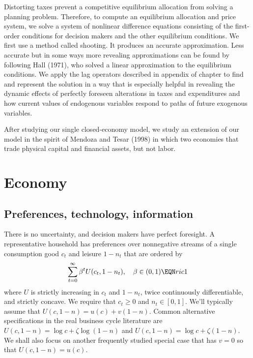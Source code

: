 Distorting taxes prevent a competitive equilibrium allocation
from solving a planning problem. Therefore, to compute an equilibrium allocation and price
system, we
solve a system of nonlinear difference equations consisting of the
first-order conditions for decision makers and the other
equilibrium conditions.  We first use a method called shooting. It  produces an accurate
approximation. Less accurate but in some ways more revealing
approximations can be found by following Hall (1971), who solved a
 linear approximation to the equilibrium conditions.
We  apply the lag operators described in appendix  of chapter   to find and represent the solution in a way that is
especially helpful in revealing the dynamic effects of perfectly
foreseen alterations in   taxes and expenditures and  how current values of
 endogenous
variables respond to paths of future exogenous variables.  %

After studying our single closed-economy model, we study an extension of our model in the spirit of Mendoza and Tesar (1998) in which 
two economies that trade physical capital and financial assets, but not labor.
%
%

\section{Economy}

\subsection{Preferences, technology, information}

There is no uncertainty,  and decision makers have perfect foresight.
A representative household has preferences over nonnegative streams of
a single
consumption good $c_t$ and leisure $1-n_t$ that are ordered by
$$ \sum_{t=0}^\infty \beta^t U(c_t, 1-n_t), \quad \beta \in (0,1) \EQN ric1 $$
where $U$ is strictly increasing in $c_t  $ and $1-n_t $, twice
continuously differentiable, and strictly concave. We require that $c_t \geq 0 $
and $n_t \in [0,1]$.  We'll
typically assume that $U(c,1-n) = u(c)+v(1-n)$. Common alternative
specifications in the real business cycle literature are $U(c,1-n)
= \log c + \zeta \log (1-n)$ and $U(c,1-n) = \log c + \zeta
(1-n)$.
%
%
%
 We shall also focus on
another frequently studied special case that
 has $v=0$ so that $U(c,1-n)=u(c)$.

